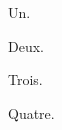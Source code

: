 \begin{remark} %
  Un.
\end{remark}
\begin{remark}
  Deux.
\end{remark}

\begin{myremark}
  Trois.
\end{myremark}
\begin{remark}
  Quatre.
\end{remark}

